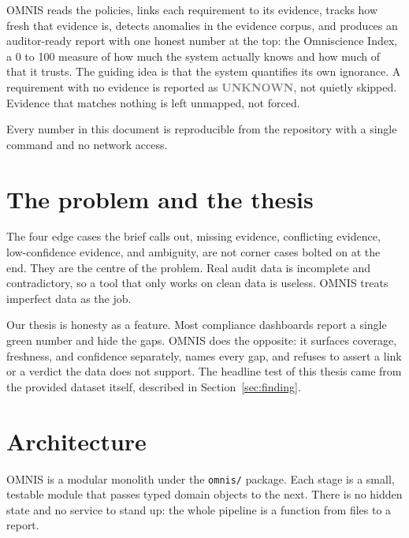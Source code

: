 \documentclass[11pt]{article}
\newcommand{\code}[1]{\texttt{\small #1}}
\newcommand{\chip}[2]{\textcolor{#1}{\sffamily\bfseries\footnotesize #2}}
\begin{document}
OMNIS reads the policies, links each requirement to its evidence, tracks how fresh that
evidence is, detects anomalies in the evidence corpus, and produces an auditor-ready
report with one honest number at the top: the Omniscience Index, a 0 to 100 measure of
how much the system actually knows and how much of that it trusts. The guiding idea is
that the system quantifies its own ignorance. A requirement with no evidence is reported
as \chip{grey}{UNKNOWN}, not quietly skipped. Evidence that matches nothing is left
unmapped, not forced.

Every number in this document is reproducible from the repository with a single command
and no network access.

\section{The problem and the thesis}

The four edge cases the brief calls out, missing evidence, conflicting evidence,
low-confidence evidence, and ambiguity, are not corner cases bolted on at the end. They
are the centre of the problem. Real audit data is incomplete and contradictory, so a
tool that only works on clean data is useless. OMNIS treats imperfect data as the job.

Our thesis is honesty as a feature. Most compliance dashboards report a single green
number and hide the gaps. OMNIS does the opposite: it surfaces coverage, freshness, and
confidence separately, names every gap, and refuses to assert a link or a verdict the
data does not support. The headline test of this thesis came from the provided dataset
itself, described in Section~\ref{sec:finding}.

\section{Architecture}

OMNIS is a modular monolith under the \code{omnis/} package. Each stage is a small,
testable module that passes typed domain objects to the next. There is no hidden state
and no service to stand up: the whole pipeline is a function from files to a report.
\end{document}
